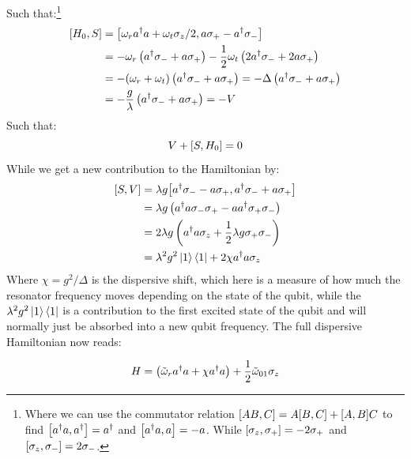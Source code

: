 Such that:\footnote{Where we can use the commutator relation $\comm{AB}{C} = A\comm{B}{C} + \comm{A}{B}C$ to find $\comm{a^\dagger a}{a^\dagger} = a^\dagger$ and $\comm{a^\dagger a}{a} = - a$. While $\comm{\sigma_z}{\sigma_+} = -2\sigma_+$ and $\comm{\sigma_z}{\sigma_-} = 2\sigma_-$.}
\begin{align*}
    \comm{H_0}{S} &= \comm{\omega_r a^\dagger a + \omega_t \sigma_z / 2}{a \sigma_+ - a^\dagger \sigma_-} \\
    &= - \omega_r \left(a^\dagger \sigma_- + a \sigma_+\right) - \frac12 \omega_t \left(2a^\dagger \sigma_- + 2 a \sigma_+ \right) \\
    &= -  (\omega_r + \omega_t)\left(a^\dagger \sigma_- + a \sigma_+\right) = - \Delta \left(a^\dagger \sigma_- + a \sigma_+\right) \\
    &= - \frac{g}{\lambda} \left(a^\dagger \sigma_- + a \sigma_+\right) = - V 
\end{align*}
Such that:
\begin{equation*}
    V + \comm{S}{H_0} = 0
\end{equation*}
While we get a new contribution to the Hamiltonian by:
\begin{align*}
    \comm{S}{V} &= \lambda g \comm{a^\dagger \sigma_- - a \sigma_+}{a^\dagger \sigma_- + a \sigma_+} \\
                &= \lambda g \left(a^\dagger a \sigma_- \sigma_+ - a a^\dagger \sigma_+ \sigma_-\right) \\
                &= 2 \lambda g \left(a^\dagger a \sigma_z + \frac12 \lambda g \sigma_+\sigma_-\right) \\
                &= \lambda^2 g^2 \ket{1}\bra{1} + 2 \chi a^\dagger a \sigma_z
\end{align*}
Where $\chi= g^2 / \Delta$ is the dispersive shift, which here is a measure of how much the resonator frequency moves depending on the state of the qubit, while the $\lambda^2 g^2 \ket{1}\bra{1}$ is a contribution to the first excited state of the qubit and will normally just be absorbed into a new qubit frequency. The full dispersive Hamiltonian now reads:

\begin{equation}
    H = \left(\Tilde{\omega}_r a^\dagger a + \chi a^\dagger a \right)  + \frac12 \Tilde{\omega}_{01} \sigma_z
\end{equation}

